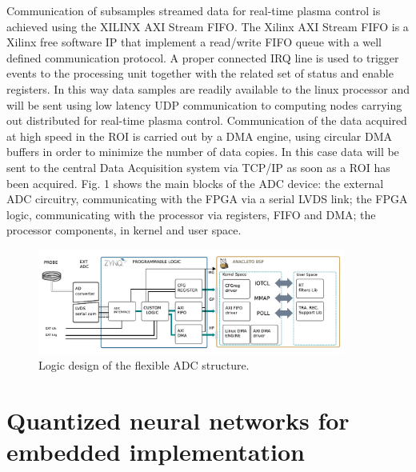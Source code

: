 Communication of subsamples streamed data for real-time plasma control is achieved using the XILINX AXI Stream FIFO. The Xilinx AXI Stream FIFO is a Xilinx free software IP that implement a read/write FIFO queue with a well defined communication protocol. A proper connected IRQ line is used to trigger events to the processing unit together with the related set of status and enable registers. In this way data samples are readily available to the linux processor and will be sent using low latency UDP communication to computing nodes carrying out distributed for real-time plasma control. Communication of the data acquired at high speed in the ROI is carried out by a DMA engine, using circular DMA buffers in order to minimize the number of data copies. In this case data will be sent to the central Data Acquisition system via TCP/IP as soon as a ROI has been acquired. Fig. 1 shows the main blocks of the ADC device: the external ADC circuitry, communicating with the FPGA via a serial LVDS link; the FPGA logic, communicating with the processor via registers, FIFO and DMA; the processor components, in kernel and user space. 
~
~
\begin{figure}[ht]
\centering
\includegraphics[width=0.9\textwidth]{img/4_EmbeddedML/schema_logico.pdf}
\caption{Logic design of the flexible ADC structure.}
\label{fig:logic}
\end{figure}









\section{Quantized neural networks for embedded implementation}

